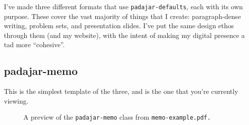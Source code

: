 \documentclass[11pt]{padajar-memo}
\begin{document}
I've made three different formats that use \texttt{padajar-defaults}, each with its own purpose. These cover the vast majority of things that I create: paragraph-dense writing, problem sets, and presentation slides. I've put the same design ethos through them (and my website), with the intent of making my digital presence a tad more ``cohesive''.

\subsection{padajar-memo}
This is the simplest template of the three, and is the one that you're currently viewing.

\begin{figure}[ht]
	\caption{A preview of the \texttt{padajar-memo} class from \texttt{memo-example.pdf.}}
	\begin{center}
	\end{center}
\end{figure}
\end{document}
